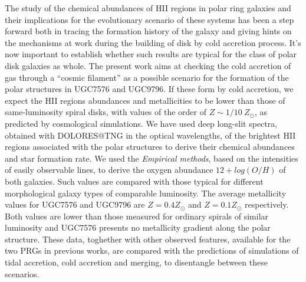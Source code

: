\documentclass{aa}
\begin{document}
 \abstract
{The study of the chemical
 abundances of HII regions in polar ring galaxies and their
 implications for the evolutionary scenario of these systems has been
 a step forward both in tracing the formation history of the galaxy
 and giving hints on the mechanisms at work during the building of
 disk by cold accretion process. It's now important to establish
 whether such results are typical for the class of polar disk galaxies
 as whole.}
{The present work aims at checking the cold
   accretion of gas through a ``cosmic filament'' as a possible
   scenario for the formation of the polar structures in UGC7576 and
   UGC9796. If these form by cold accretion, we expect the HII regions
   abundances and metallicities to be lower than those of
   same-luminosity spiral disks, with values of the order of $Z \sim
   1/10\ Z_{\odot}$, as predicted by cosmological simulations.}
{We have used deep long-slit spectra,
     obtained with DOLORES@TNG in the optical wavelengths, of the
     brightest HII regions associated with the polar structures to
     derive their chemical abundances and star formation rate. We used
     the \emph{Empirical methods}, based on the intensities of easily
     observable lines, to derive the oxygen abundance $12+log(O/H)$ of
     both galaxies. Such values are compared with those typical for
     different morphological galaxy types of comparable luminosity.}
{The average metallicity values for
UGC7576 and UGC9796 are $Z = 0.4 Z_{\odot}$ and $Z = 0.1 Z_{\odot}$
respectively. Both values are lower than those measured for ordinary
spirals of similar luminosity and UGC7576 presents no metallicity
gradient along the polar structure. These data, toghether with other
observed features, available for the two PRGs in previous works, are
compared with the predictions of simulations of tidal accretion,
cold accretion and merging, to disentangle between these scenarios.}
   {}


   \maketitle
%
\end{document}
